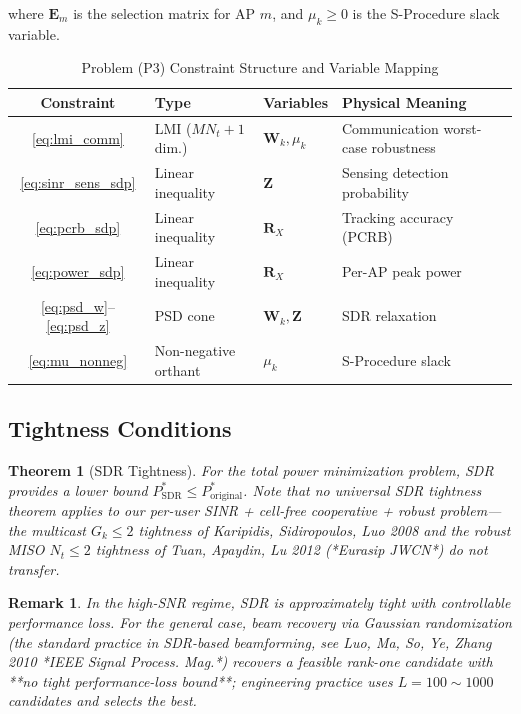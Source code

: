\documentclass[12pt,a4paper]{article}
\newtheorem{theorem}{Theorem}
\newtheorem{remark}{Remark}
\newcommand{\mat}[1]{\mathbf{#1}}
\begin{document}
where $\mat{E}_m$ is the selection matrix for AP $m$, and $\mu_k \geq 0$ is the S-Procedure slack variable.

\begin{table}[htbp]
\centering
\caption{Problem (P3) Constraint Structure and Variable Mapping}\label{tab:p3_structure}
\begin{tabular}{clll}
\toprule
Constraint & Type & Variables & Physical Meaning \\
\midrule
\eqref{eq:lmi_comm} & LMI ($MN_t+1$ dim.) & $\mat{W}_k, \mu_k$ & Communication worst-case robustness \\
\eqref{eq:sinr_sens_sdp} & Linear inequality & $\mat{Z}$ & Sensing detection probability \\
\eqref{eq:pcrb_sdp} & Linear inequality & $\mat{R}_X$ & Tracking accuracy (PCRB) \\
\eqref{eq:power_sdp} & Linear inequality & $\mat{R}_X$ & Per-AP peak power \\
\eqref{eq:psd_w}--\eqref{eq:psd_z} & PSD cone & $\mat{W}_k, \mat{Z}$ & SDR relaxation \\
\eqref{eq:mu_nonneg} & Non-negative orthant & $\mu_k$ & S-Procedure slack \\
\bottomrule
\end{tabular}
\end{table}



\subsection{Tightness Conditions}

\begin{theorem}[SDR Tightness]\label{thm:1}
For the total power minimization problem, SDR provides a lower bound $P_{\text{SDR}}^* \leq P_{\text{original}}^*$. Note that no universal SDR tightness theorem applies to our per-user SINR + cell-free cooperative + robust problem—the multicast $G_k \leq 2$ tightness of Karipidis, Sidiropoulos, Luo 2008 and the robust MISO $N_t \leq 2$ tightness of Tuan, Apaydin, Lu 2012 (*Eurasip JWCN*) do not transfer.
\end{theorem}

\begin{remark}
In the high-SNR regime, SDR is approximately tight with controllable performance loss. For the general case, beam recovery via Gaussian randomization (the standard practice in SDR-based beamforming, see Luo, Ma, So, Ye, Zhang 2010 *IEEE Signal Process. Mag.*) recovers a feasible rank-one candidate with **no tight performance-loss bound**; engineering practice uses $L = 100 \sim 1000$ candidates and selects the best.
\end{remark}
\end{document}

